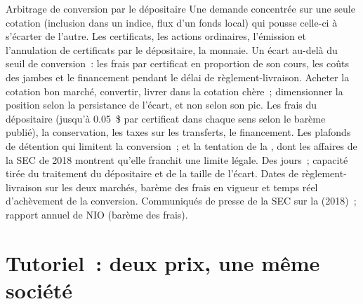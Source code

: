 \begin{strategyfile}{Arbitrage de conversion par le dépositaire}\label{strat:hf:depositary-receipts-and-dual-listings:conversion}
 Une demande concentrée sur une seule cotation (inclusion dans un indice, flux d'un fonds local) qui pousse celle-ci à s'écarter de l'autre.
 Les certificats, les actions ordinaires, l'émission et l'annulation de certificats par le dépositaire, la monnaie.
 Un écart au-delà du seuil de conversion~: les frais par certificat en proportion de son cours, les coûts des jambes et le financement pendant le
délai de règlement-livraison.
 Acheter la cotation bon marché, convertir, livrer dans la cotation chère~; dimensionner la position selon la persistance de l'écart, et non selon son pic.
 Les frais du dépositaire (jusqu'à 0.05~\$ par certificat dans chaque sens selon le barème publié), la conservation, les taxes sur les transferts, le financement.
 Les plafonds de détention qui limitent la conversion~; et la tentation de la , dont les affaires de la SEC de 2018 montrent qu'elle franchit une limite légale.
 Des jours~; capacité tirée du traitement du dépositaire et de la taille de l'écart.
 Dates de règlement-livraison sur les deux marchés, barème des frais en vigueur et temps réel d'achèvement de la conversion.
 Communiqués de presse de la SEC sur la  (2018)~; rapport annuel de NIO (barème des frais).
\end{strategyfile}

\section{Tutoriel~: deux prix, une même société}\label{tut:hf:depositary-receipts-and-dual-listings:tut}

